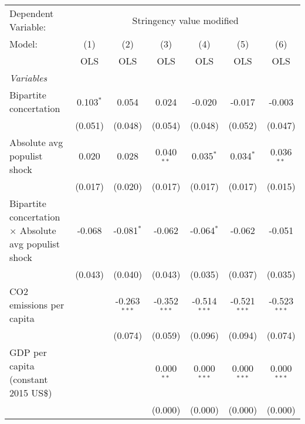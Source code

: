 
\begingroup
\centering
\begin{tabular}{lcccccc}
   \toprule
   Dependent Variable: & \multicolumn{6}{c}{Stringency value modified}\\
   Model:                                                       & (1)         & (2)            & (3)            & (4)            & (5)            & (6)\\  
                                                                &  OLS        & OLS            & OLS            & OLS            & OLS            & OLS\\  
   \midrule
   \emph{Variables}\\
   Bipartite concertation                                       & 0.103$^{*}$ & 0.054          & 0.024          & -0.020         & -0.017         & -0.003\\   
                                                                & (0.051)     & (0.048)        & (0.054)        & (0.048)        & (0.052)        & (0.047)\\   
   Absolute avg populist shock                                  & 0.020       & 0.028          & 0.040$^{**}$   & 0.035$^{*}$    & 0.034$^{*}$    & 0.036$^{**}$\\   
                                                                & (0.017)     & (0.020)        & (0.017)        & (0.017)        & (0.017)        & (0.015)\\   
   Bipartite concertation $\times$ Absolute avg populist shock  & -0.068      & -0.081$^{*}$   & -0.062         & -0.064$^{*}$   & -0.062         & -0.051\\   
                                                                & (0.043)     & (0.040)        & (0.043)        & (0.035)        & (0.037)        & (0.035)\\   
   CO2 emissions per capita                                     &             & -0.263$^{***}$ & -0.352$^{***}$ & -0.514$^{***}$ & -0.521$^{***}$ & -0.523$^{***}$\\   
                                                                &             & (0.074)        & (0.059)        & (0.096)        & (0.094)        & (0.074)\\   
   GDP per capita (constant 2015 US\$)                          &             &                & 0.000$^{**}$   & 0.000$^{***}$  & 0.000$^{***}$  & 0.000$^{***}$\\   
                                                                &             &                & (0.000)        & (0.000)        & (0.000)        & (0.000)\\   

\end{tabular}
